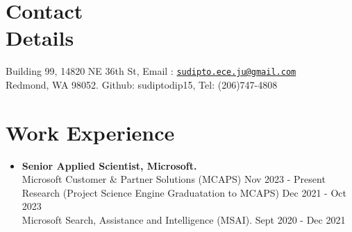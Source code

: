 \documentclass[margin,line]{resume}
\begin{document}
\name{\Large{\color{blue}{Sudipto Mukherjee}}\hspace{257pt}{\color{blue}{Curriculum Vitae}}}
\begin{resume}

    \section{\mysidestyle Contact\\Details}

    Building 99, 14820 NE 36th St, \hfill Email : \href{mailto:sudmukh@microsoft.com}{\nolinkurl{sudipto.ece.ju@gmail.com}} \\ 
    Redmond, WA 98052. \hfill Github: sudiptodip15,  Tel: (206)747-4808    
%
    \section{\mysidestyle Work Experience}
\begin{itemize}
\vspace{-0.5pt}
\item \textbf{Senior Applied Scientist, Microsoft.} \\
Microsoft Customer \& Partner Solutions (MCAPS) \hfill Nov 2023 - Present\\
 Research (Project Science Engine Graduatation to MCAPS)  \hfill Dec 2021 - Oct 2023\\
Microsoft Search, Assistance and Intelligence (MSAI). \hfill Sept 2020 - Dec 2021\\
\end{itemize}
    
                                
%

\end{resume}
\end{document}
